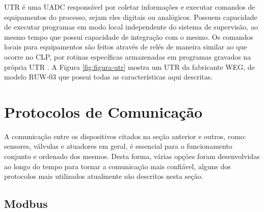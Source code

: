     \label{sec:utr}

       \gls{UTR} é uma \gls{UADC} responsável por coletar informações e executar comandos de equipamentos do processo, sejam eles digitais ou analógicos. Possuem capacidade de executar programas em modo local independente do sistema de supervisão, ao mesmo tempo que possui capacidade de integração com o mesmo. Os comandos locais para equipamentos são feitos através de relés de maneira similar ao que ocorre no \gls{CLP}, por rotinas específicas armazenadas em programas gravados na própria \gls{UTR} \cite{mamede-instalacoes}. A Figura \ref{fig:figura-utr} mostra um \gls{UTR} da fabricante WEG, de modelo RUW-03 que possui todas as características aqui descritas.
       
        \begin{figure}[!h]
	    \end{figure}
      

    \section{Protocolos de Comunicação}
    \label{sec:protocolos}
    A comunicação entre os dispositivos citados na seção anterior e outros, como: sensores, válvulas e atuadores em geral, é essencial para o funcionamento conjunto e ordenado dos mesmos. Desta forma, várias opções foram desenvolvidas ao longo do tempo para tornar a comunicação mais confiável, alguns dos protocolos mais utilizados atualmente são descritos nesta seção.
    
    \subsection{Modbus}
    \label{sec:modbus}
    
